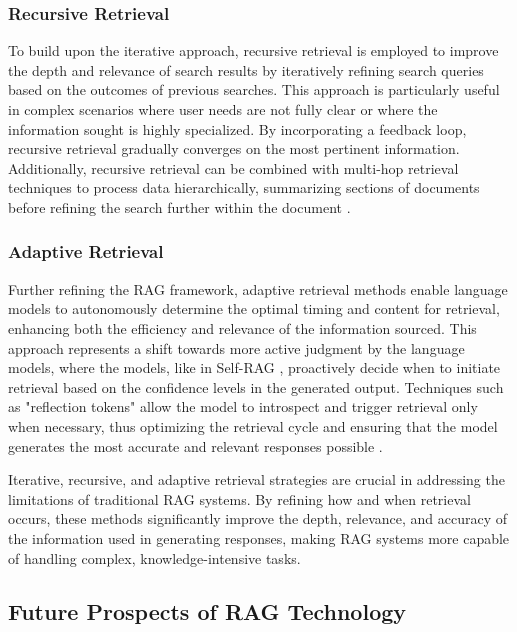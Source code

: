 \subsubsection{Recursive Retrieval}

To build upon the iterative approach, recursive retrieval is employed to improve the depth and relevance of search results by iteratively refining search queries based on the outcomes of previous searches. This approach is particularly useful in complex scenarios where user needs are not fully clear or where the information sought is highly specialized. By incorporating a feedback loop, recursive retrieval gradually converges on the most pertinent information. Additionally, recursive retrieval can be combined with multi-hop retrieval techniques to process data hierarchically, summarizing sections of documents before refining the search further within the document \cite{gao2023retrieval}.

\subsubsection{Adaptive Retrieval}

Further refining the RAG framework, adaptive retrieval methods enable language models to autonomously determine the optimal timing and content for retrieval, enhancing both the efficiency and relevance of the information sourced. This approach represents a shift towards more active judgment by the language models, where the models, like in Self-RAG \cite{asai2023self}, proactively decide when to initiate retrieval based on the confidence levels in the generated output. Techniques such as "reflection tokens" allow the model to introspect and trigger retrieval only when necessary, thus optimizing the retrieval cycle and ensuring that the model generates the most accurate and relevant responses possible \cite{gao2023retrieval}.

Iterative, recursive, and adaptive retrieval strategies are crucial in addressing the limitations of traditional RAG systems. By refining how and when retrieval occurs, these methods significantly improve the depth, relevance, and accuracy of the information used in generating responses, making RAG systems more capable of handling complex, knowledge-intensive tasks.

\subsection{Future Prospects of RAG Technology}

